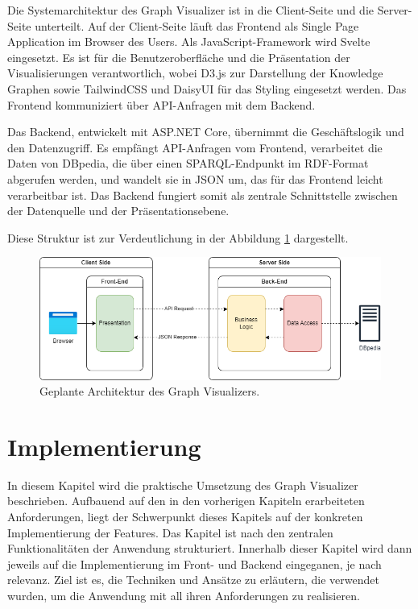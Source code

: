 Die Systemarchitektur des Graph Visualizer ist in die Client-Seite und die Server-Seite unterteilt. Auf der Client-Seite läuft das Frontend als Single Page Application im Browser des Users. Als JavaScript-Framework wird Svelte eingesetzt. Es ist für die Benutzeroberfläche und die Präsentation der Visualisierungen verantwortlich, wobei D3.js zur Darstellung der Knowledge Graphen sowie TailwindCSS und DaisyUI für das Styling eingesetzt werden. Das Frontend kommuniziert über API-Anfragen mit dem Backend.

Das Backend, entwickelt mit ASP.NET Core, übernimmt die Geschäftslogik und den Datenzugriff. Es empfängt API-Anfragen vom Frontend, verarbeitet die Daten von DBpedia, die über einen SPARQL-Endpunkt im RDF-Format abgerufen werden, und wandelt sie in JSON um, das für das Frontend leicht verarbeitbar ist. Das Backend fungiert somit als zentrale Schnittstelle zwischen der Datenquelle und der Präsentationsebene.

Diese Struktur ist zur Verdeutlichung in der Abbildung \ref{fig:realization:concept:architecture} dargestellt.

\begin{figure}[h]
    \centering
    \includegraphics[height=.35\textwidth]{images/03/Architecture.drawio.png}
    \caption{Geplante Architektur des Graph Visualizers.}
    \label{fig:realization:concept:architecture}
\end{figure}

\section{Implementierung}

In diesem Kapitel wird die praktische Umsetzung des Graph Visualizer beschrieben. Aufbauend auf den in den vorherigen Kapiteln erarbeiteten Anforderungen, liegt der Schwerpunkt dieses Kapitels auf der konkreten Implementierung der Features. Das Kapitel ist nach den zentralen Funktionalitäten der Anwendung strukturiert. Innerhalb dieser Kapitel wird dann jeweils auf die Implementierung im Front- und Backend eingeganen, je nach relevanz. Ziel ist es, die Techniken und Ansätze zu erläutern, die verwendet wurden, um die Anwendung mit all ihren Anforderungen zu realisieren.

